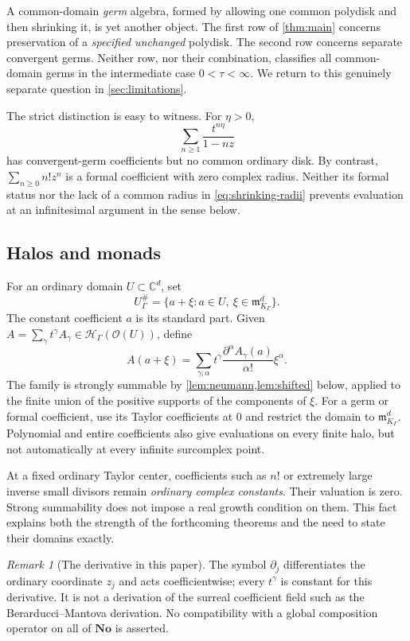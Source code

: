 \documentclass[11pt,letterpaper]{article}
\theoremstyle{definition}
\theoremstyle{remark}
\newtheorem{remark}[remark]{Remark}
\newcommand{\C}{\mathbb C}
\newcommand{\No}{\mathbf{No}}
\newcommand{\HH}{\mathscr H}
\newcommand{\OO}{\mathcal O}
\newcommand{\m}{\mathfrak m}
\numberwithin{equation}{section}
\begin{document}
A common-domain \emph{germ} algebra, formed by allowing one common polydisk
and then shrinking it, is yet another object. The first row of
\cref{thm:main} concerns preservation of a \emph{specified unchanged}
polydisk. The second row concerns separate convergent germs. Neither row,
nor their combination, classifies all common-domain germs in the intermediate
case $0<\tau<\infty$. We return to this genuinely separate question in
\cref{sec:limitations}.

The strict distinction is easy to witness. For $\eta>0$,
\begin{equation}\label{eq:shrinking-radii}
 \sum_{n\ge1}\frac{t^{n\eta}}{1-nz}
\end{equation}
has convergent-germ coefficients but no common ordinary disk. By contrast,
$\sum_{n\ge0}n!z^n$ is a formal coefficient with zero complex radius. Neither
its formal status nor the lack of a common radius in \eqref{eq:shrinking-radii}
prevents evaluation at an infinitesimal argument in the sense below.

\subsection{Halos and monads}
For an ordinary domain $U\subset\C^d$, set
\[
 U_\Gamma^\#=\{a+\xi:a\in U,\ \xi\in\m_{K_\Gamma}^d\}.
\]
The constant coefficient $a$ is its standard part. Given
$A=\sum_\gamma t^\gamma A_\gamma\in\HH_\Gamma(\OO(U))$, define
\begin{equation}\label{eq:halo-evaluation}
 A(a+\xi)=
 \sum_{\gamma,\alpha}t^\gamma
 \frac{\partial^\alpha A_\gamma(a)}{\alpha!}\xi^\alpha.
\end{equation}
The family is strongly summable by \cref{lem:neumann,lem:shifted} below,
applied to the finite union of the positive supports of the components of
$\xi$. For a germ or formal coefficient, use its Taylor coefficients at
$0$ and restrict the domain to $\m_{K_\Gamma}^d$. Polynomial and entire
coefficients also give evaluations on every finite halo, but not automatically
at every infinite surcomplex point.

At a fixed ordinary Taylor center, coefficients such as $n!$ or extremely
large inverse small divisors remain \emph{ordinary complex constants}.
Their valuation is zero. Strong summability does not impose a real growth
condition on them. This fact explains both the strength of the forthcoming
theorems and the need to state their domains exactly.

\begin{remark}[The derivative in this paper]
The symbol $\partial_j$ differentiates the ordinary coordinate $z_j$ and
acts coefficientwise; every $t^\gamma$ is constant for this derivative.
It is not a derivation of the surreal coefficient field such as the
Berarducci--Mantova derivation. No compatibility with a global composition
operator on all of $\No$ is asserted.
\end{remark}
\end{document}
